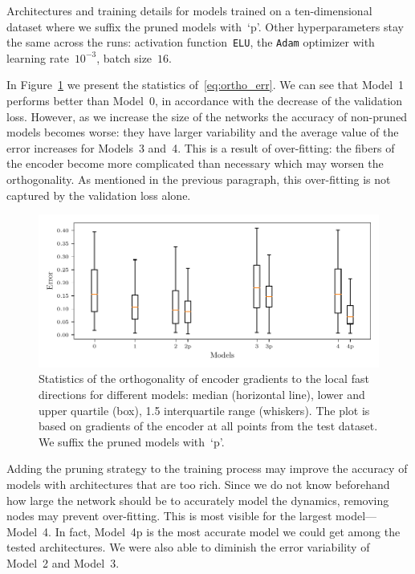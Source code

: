\documentclass{article}
\let\oldtodo\todo
\renewcommand{\todo}[1]{\oldtodo[size=\footnotesize,color=mplorange!40]{#1}}
\begin{document}
\begin{table}
    \centering
    \medskip
    \caption{Architectures and training details for models trained on a ten-dimensional dataset where we suffix the pruned models with~`p'. Other hyperparameters stay the same across the runs: activation function~\texttt{ELU}, the \texttt{Adam} optimizer with learning rate~$10^{-3}$, batch size~$16$.}
    \label{tab:quad10_architecture}
\end{table}

In Figure~\ref{fig:quad10d_enc_err_derivatives} we present the statistics of~\eqref{eq:ortho_err}. We can see that Model~1 performs better than Model~0, in accordance with the decrease of the validation loss. However, as we increase the size of the networks the accuracy of non-pruned models becomes worse: they have larger variability and the average value of the error increases for Models~3 and~4. This is a result of over-fitting: the fibers of the encoder become more complicated than necessary which may worsen the orthogonality. As mentioned in the previous paragraph, this over-fitting is not captured by the validation loss alone.%

\begin{figure}
    \centering
    \includegraphics[width=\textwidth]{figs/quad10d_enc_err_derivatives.pdf}
    \caption{Statistics of the orthogonality of encoder gradients to the local fast directions for different models: median (horizontal line), lower and upper quartile (box), 1.5 interquartile range (whiskers). The plot is based on gradients of the encoder at all points from the test dataset. We suffix the pruned models with~`p'.}
    \label{fig:quad10d_enc_err_derivatives}
\end{figure}

Adding the pruning strategy to the training process may improve the accuracy of models with architectures that are too rich. Since we do not know beforehand how large the network should be to accurately model the dynamics, removing nodes may prevent over-fitting. This is most visible for the largest model---Model~4. In fact, Model~4p is the most accurate model we could get among the tested architectures. We were also able to diminish the error variability of Model~2 and Model~3.
\end{document}
